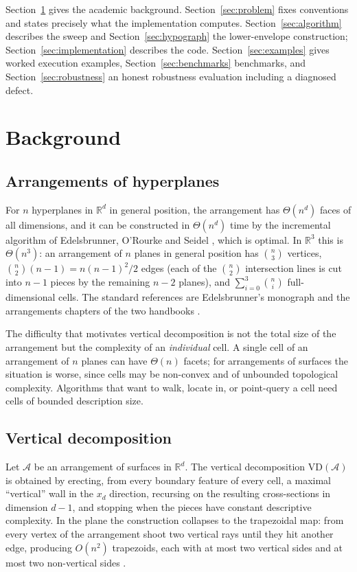 \documentclass[11pt]{article}
\newcommand{\R}{\mathbb{R}}
\newcommand{\VD}{\mathrm{VD}}
\newcommand{\Arr}{\mathcal{A}}
\begin{document}
Section~\ref{sec:background} gives the academic background.
Section~\ref{sec:problem} fixes conventions and states precisely what the
implementation computes.  Section~\ref{sec:algorithm} describes the sweep and
Section~\ref{sec:hypograph} the lower-envelope construction;
Section~\ref{sec:implementation} describes the code.
Section~\ref{sec:examples} gives worked execution examples,
Section~\ref{sec:benchmarks} benchmarks, and Section~\ref{sec:robustness} an
honest robustness evaluation including a diagnosed defect.

\section{Background}
\label{sec:background}

\subsection{Arrangements of hyperplanes}

For $n$ hyperplanes in $\R^d$ in general position, the arrangement has
$\Theta(n^d)$ faces of all dimensions, and it can be constructed in
$\Theta(n^d)$ time by the incremental algorithm of Edelsbrunner, O'Rourke and
Seidel \cite{eos86}, which is optimal.  In $\R^3$ this is $\Theta(n^3)$: an
arrangement of $n$ planes in general position has $\binom{n}{3}$ vertices,
$\binom{n}{2}(n-1) = n(n-1)^2/2$ edges (each of the $\binom{n}{2}$ intersection
lines is cut into $n-1$ pieces by the remaining $n-2$ planes), and
$\sum_{i=0}^{3}\binom{n}{i}$ full-dimensional cells.  The standard references are Edelsbrunner's monograph
\cite{edelsbrunner-book} and the arrangements chapters of the two handbooks
\cite{halperin-sharir-handbook,agarwal-sharir-handbook}.

The difficulty that motivates vertical decomposition is not the total size of
the arrangement but the complexity of an \emph{individual} cell.  A single cell
of an arrangement of $n$ planes can have $\Theta(n)$ facets; for arrangements
of surfaces the situation is worse, since cells may be non-convex and of
unbounded topological complexity.  Algorithms that want to walk, locate in, or
point-query a cell need cells of bounded description size.

\subsection{Vertical decomposition}

Let $\Arr$ be an arrangement of surfaces in $\R^d$.  The vertical decomposition
$\VD(\Arr)$ is obtained by erecting, from every boundary feature of every cell,
a maximal ``vertical'' wall in the $x_d$ direction, recursing on the resulting
cross-sections in dimension $d-1$, and stopping when the pieces have constant
descriptive complexity.  In the plane the construction collapses to the
trapezoidal map: from every vertex of the arrangement shoot two vertical rays
until they hit another edge, producing $O(n^2)$ trapezoids, each with at most
two vertical sides and at most two non-vertical sides
\cite{seidel-trapezoid,mulmuley,deberg-book}.
\end{document}
